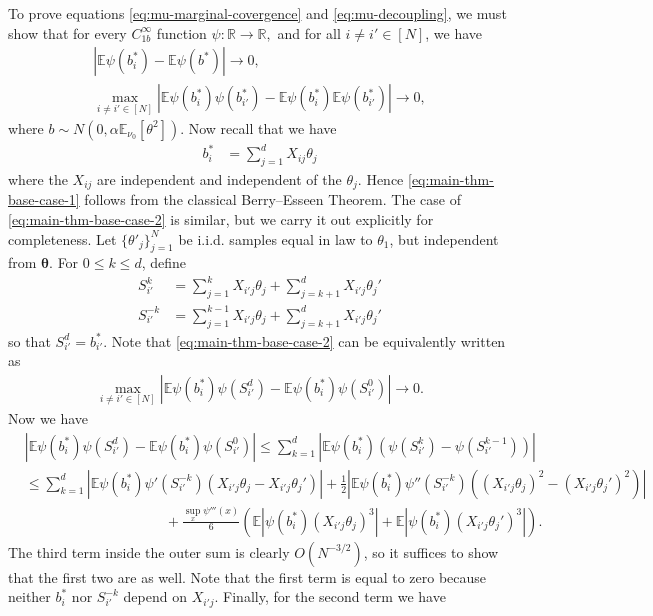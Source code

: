 \documentclass{article}
\newcommand{\1}{\mathbbm{1}}
\theoremstyle{plain}
\theoremstyle{definition}
\theoremstyle{remark}
\newcommand{\E}{\mathbb{E}}
\newcommand{\bftheta}{\boldsymbol{\theta}}
\newcommand{\R}{\mathbb{R}}
\begin{document}
To prove equations \eqref{eq:mu-marginal-covergence} and \eqref{eq:mu-decoupling}, we must show that for every $C^\infty_{1b}$ function $\psi:\R\to\R,$ and for all $i\neq i'\in [N]$, we have 
    \begin{align}
         |\E\psi(b^*_i) - \E \psi(b^*)|\to 0,\label{eq:main-thm-base-case-1} \\
        \max_{i\neq i' \in [N]} |\E\psi(b^*_i)\psi(b^*_{i'}) - \E\psi(b^*_i)\E\psi(b^*_{i'}) | \to 0,\label{eq:main-thm-base-case-2}
    \end{align}
    where $b\sim N(0,\alpha \E_{\nu_0}[\theta^2])$. Now recall that we have
    \begin{align*}
        b^*_i &= \sum_{j=1}^d X_{ij} \theta_j 
    \end{align*}
    where the $X_{ij}$ are independent and independent of the $\theta_j.$ Hence \eqref{eq:main-thm-base-case-1} follows from the classical Berry–Esseen Theorem. The case of \eqref{eq:main-thm-base-case-2} is similar, but we carry it out explicitly for completeness. Let $\{\theta'_j\}_{j=1}^N$ be i.i.d. samples equal in law to $\theta_1$, but independent from $\bftheta.$ For $0\leq k\leq d$, define
    \begin{align*}
        S_{i'}^k &= \sum_{j=1}^k X_{i'j} \theta_j + \sum_{j=k+1}^d X_{i'j} \theta_j' \\
        S_{i'}^{-k} &= \sum_{j=1}^{k-1} X_{i'j} \theta_j + \sum_{j=k+1}^d X_{i'j} \theta_j' 
    \end{align*}
    so that $S^d_{i'} = b^*_{i'}.$ Note that \eqref{eq:main-thm-base-case-2} can be equivalently written as 
    \begin{align*}
        \max_{i\neq i' \in [N]} |\E\psi(b^*_i)\psi(S_{i'}^d) - \E\psi(b^*_i)\psi(S_{i'}^0) | \to 0.
    \end{align*}
    Now we have 
    \begin{align*}
        &|\E\psi(b^*_i)\psi(S_{i'}^d) - \E\psi(b^*_i)\psi(S_{i'}^0)| \leq \sum_{k=1}^d |\E\psi(b^*_i)(\psi(S_{i'}^k) - \psi(S_{i'}^{k-1})) | \\
        &\leq \sum_{k=1}^d |\E\psi(b^*_i)\psi'(S_{i'}^{-k})(X_{i'j}\theta_j - X_{i'j}\theta_j')| + \frac{1}{2} |\E\psi(b^*_i)\psi''(S_{i'}^{-k})((X_{i'j}\theta_j)^2 - (X_{i'j}\theta_j')^2)| \\
        &\qquad \qquad \qquad \qquad \qquad +\frac{\sup_x \psi'''(x)}{6}(\E|\psi(b^*_i)(X_{i'j}\theta_j)^3| + \E|\psi(b^*_i)(X_{i'j}\theta_j')^3|).
    \end{align*}
    The third term inside the outer sum is clearly $ O(N^{-3/2})$, so it suffices to show that the first two are as well. Note that the first term is equal to zero because neither $b^*_i$ nor $S^{-k}_{i'}$ depend on $X_{i'j}.$ Finally, for the second term we have
\end{document}
